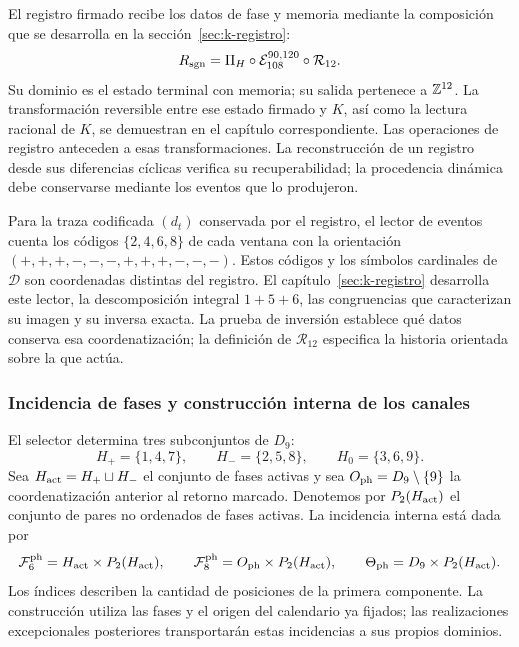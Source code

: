 El registro firmado recibe los datos de fase y memoria mediante la
composición que se desarrolla en la sección~\ref{sec:k-registro}:
\begin{equation}
 R_{\rm sgn}=\Pi_H\circ\mathcal E_{108}^{90,120}
                         \circ\mathcal R_{12}.
 \label{tpk-int:registro-causal}
\end{equation}
Su dominio es el estado terminal con memoria; su salida pertenece a
\(\mathbb Z^{12}\). La transformación reversible entre ese estado firmado
y \(K\), así como la lectura racional de \(K\), se demuestran en
el capítulo correspondiente. Las operaciones de registro anteceden a
esas transformaciones. La reconstrucción de un registro desde sus
diferencias cíclicas verifica su recuperabilidad; la procedencia dinámica
debe conservarse mediante los eventos que lo produjeron.

Para la traza codificada \((d_t)\) conservada por el registro, el
lector de eventos cuenta los códigos \(\{2,4,6,8\}\) de cada
ventana con la orientación
\((+,+,+,-,-,-,+,+,+,-,-,-)\). Estos códigos y los símbolos
cardinales de \(\mathcal D\) son coordenadas distintas del
registro. El capítulo~\ref{sec:k-registro} desarrolla este lector,
la descomposición integral \(1+5+6\), las congruencias que
caracterizan su imagen y su inversa exacta. La prueba de inversión
establece qué datos conserva esa coordenatización; la definición de
\(\mathcal R_{12}\) especifica la historia orientada sobre la que
actúa.

\subsubsection{Incidencia de fases y construcción interna de los canales}
\label{tpk-int:incidencia}

El selector determina tres subconjuntos de \(D_9\):
\[
 H_+=\{1,4,7\},\qquad H_-=\{2,5,8\},\qquad H_0=\{3,6,9\}.
\]
Sea \(H_{\rm act}=H_+\sqcup H_-\) el conjunto de fases activas y
sea \(O_{\rm ph}=D_9\setminus\{9\}\) la coordenatización anterior al retorno
marcado. Denotemos por \(P_2(H_{\rm act})\) el conjunto de pares
no ordenados de fases activas. La incidencia interna está dada por
\begin{equation}
 \mathcal F^{\rm ph}_6=H_{\rm act}\times P_2(H_{\rm act}),\qquad
 \mathcal F^{\rm ph}_8=O_{\rm ph}\times P_2(H_{\rm act}),\qquad
 \Theta_{\rm ph}=D_9\times P_2(H_{\rm act}).
 \label{tpk-int:fases90120}
\end{equation}
Los índices describen la cantidad de posiciones de la primera componente.
La construcción utiliza las fases y el origen del calendario ya fijados;
las realizaciones excepcionales posteriores transportarán estas
incidencias a sus propios dominios.

